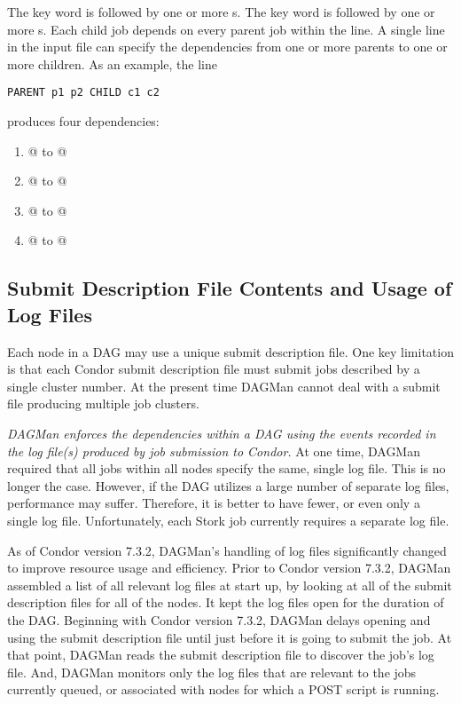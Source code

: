 \begin{itemize}
   

The  key word is followed by one or more
s.
The  key word is followed by one or more
s.
Each child job depends on every parent job within the line.
A single line in the input file can specify the dependencies from one or more
parents to one or more children.
As an example, the line
\begin{verbatim}
PARENT p1 p2 CHILD c1 c2
\end{verbatim}
produces four dependencies:
\begin{enumerate}
\item{@ to @}
\item{@ to @}
\item{@ to @}
\item{@ to @}
\end{enumerate}

\end{itemize}

\subsection{Submit Description File Contents and Usage of Log Files}

Each node in a DAG may use a unique submit description file.
One key limitation is that
each Condor submit description file must submit jobs
described by a single cluster number.
At the present time DAGMan cannot deal with a submit file producing
multiple job clusters.

\emph{DAGMan enforces the dependencies within a DAG
using the events recorded in the
log file(s) produced by job submission to Condor.}
At one time, DAGMan required that all jobs within all nodes
specify the same, single log file.
This is no longer the case.
However, if the DAG utilizes a large number of
separate log files, performance may suffer.
Therefore, it is better to have
fewer, or even only a single log file.
Unfortunately,
each Stork job currently requires a separate log file.

As of Condor version 7.3.2, DAGMan's handling of log files
significantly changed to improve resource usage and efficiency.  
Prior to Condor version 7.3.2, 
DAGMan assembled a list of all relevant log files at start up, 
by looking at all of the submit description files for all of the nodes.
It kept the log files open for the duration of the DAG.
Beginning with Condor version 7.3.2, DAGMan delays opening and using 
the submit description file until just before it is going to submit the job.
At that point, DAGMan reads the submit description file to discover 
the job's log file.
And, DAGMan monitors only the log files that are relevant
to the jobs currently queued, 
or associated with nodes for which a POST script is running.

